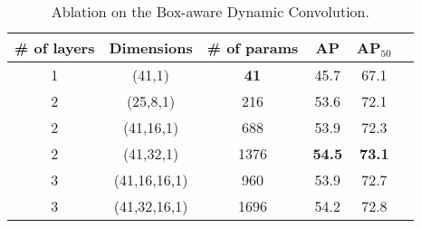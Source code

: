 \documentclass[10pt,twocolumn,letterpaper]{article}
\begin{document}

\begin{table} 
\small
\centering
\setlength{\tabcolsep}{6pt}
\begin{tabular}{c|c|c|c|cc}
\toprule
\textbf{\# of layers} & \textbf{Dimensions} & \textbf{\# of params} & \textbf{AP}  & \textbf{AP$_{50}$} \\ \midrule
1 & (41,1) & \textbf{41}  & 45.7 & 67.1 \\ 
2 & (25,8,1) & 216 & 53.6 & 72.1 \\ 
2 & (41,16,1) & 688 & 53.9 & 72.3 \\ 
2 & (41,32,1) & 1376 & \textbf{54.5} & \textbf{73.1} \\ 
3 & (41,16,16,1) & 960 & 53.9 & 72.7 \\ 
3 & (41,32,16,1) & 1696 & 54.2 & 72.8 \\ 
\bottomrule
\end{tabular}
\vspace{-4pt}
\caption{Ablation on the Box-aware Dynamic Convolution.}
\label{tab:ablation_dyco}
\vspace{-4pt}
\end{table}
\end{document}

